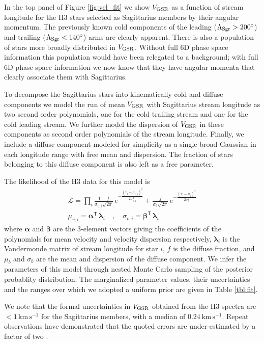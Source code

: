 \documentclass[twocolumn,tighten,twocolappendix]{aastex63}
\newcommand{\sgr}{Sagittarius}
\newcommand{\transpose}[1]{{#1}^{\!\mathsf T}}
\newcommand{\kms}{\mathrm{km} \, \mathrm{s}^{-1}}
\newcommand{\Vgsr}{V_{\rm GSR}}
\begin{document}
\begin{CJK*}{UTF8}{gbsn}
In the top panel of Figure \ref{fig:vel_fit} we show $\Vgsr$ as a function of stream longitude for the H3 stars selected as \sgr{} members by their angular momentum.  The previously known cold components of the leading ($\Lambda_{\rm Sgr}>200^\circ$) and trailing ($\Lambda_{\rm Sgr}<140^\circ$) arms are clearly apparent.  There is also a population of stars more broadly distributed in $\Vgsr$.  Without full 6D phase space information this population would have been relegated to a background; with full 6D phase space information we now know that they have angular momenta that clearly associate them with \sgr{}.

To decompose the \sgr{} stars into kinematically cold and diffuse components we model the run of mean $\Vgsr$ with \sgr{} stream longitude as two second order polynomials, one for the cold trailing stream and one for the cold leading stream.  We further model the dispersion of $\Vgsr$ in these components as second order polynomials of the stream longitude.  Finally, we include a diffuse component modeled for simplicity as a single broad Gaussian in each longitude range with free mean and dispersion.  The fraction of stars belonging to this diffuse component is also left as a free parameter.

The likelihood of the H3 data for this model is
\begin{align}
\mathcal{L}  =  \prod_i \frac{1-f}{\sigma_{v, i}\sqrt{2\pi}}\, e^{-\frac{(v_i-\mu_{v,i})^2}{2\sigma^2_{v, i}}} +
                        \frac{f}{\sigma_{b}\sqrt{2\pi}} \, e^{-\frac{(v_i-\mu_{b})^2}{2\sigma^2_{b}}} \\
\mu_{v,i} = \transpose{\boldsymbol{\alpha}} \, {\boldsymbol{\lambda}}_i \quad ,  \quad \sigma_{v,i} =\transpose{\boldsymbol{\beta}} \, {\boldsymbol{\lambda}}_i
\end{align}
where $\boldsymbol{\alpha}$ and $\boldsymbol{\beta}$ are the 3-element vectors giving the coefficients of the polynomials for mean velocity and velocity dispersion respectively,
$\boldsymbol{\lambda}_i$ is the Vandermonde matrix of stream longitude for star $i$,
$f$ is the diffuse fraction, and $\mu_b$ and $\sigma_b$ are the mean and dispersion of the diffuse component. We infer the parameters of this model through nested Monte Carlo sampling \citep{Skilling04, dynesty} of the posterior probablity distribution. The marginalized parameter values, their uncertainties and the ranges over which we adopted a uniform prior are given in Table \ref{tbl:fit}.

We note that the formal uncertainties in $\Vgsr$ obtained from the H3 spectra are $<1 \,\kms$ for the \sgr{} members, with a median of $0.24\,\kms$.  Repeat observations have demonstrated that the quoted errors are under-estimated by a factor of two \citep{Conroy19a}.


\end{CJK*}
\end{document}
